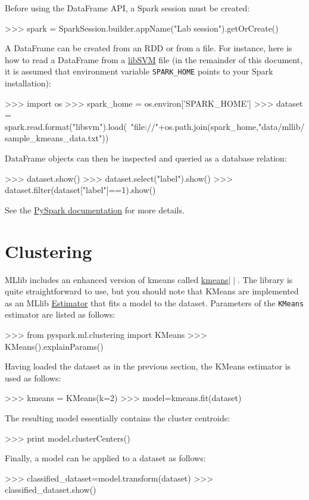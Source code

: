 \documentclass[11pt]{article}
\begin{document}
Before using the DataFrame API, a Spark session must be created:
\begin{cli}
  >>> spark = SparkSession.builder.appName("Lab session").getOrCreate()
\end{cli}
A DataFrame can be created from an RDD or from a file. For instance,
here is how to read a DataFrame from a
\href{https://www.csie.ntu.edu.tw/~cjlin/libsvm/}{libSVM} file (in the
remainder of this document, it is assumed that environment variable
\texttt{SPARK\_HOME} points to your Spark installation):
\begin{cli}
  >>> import os
  >>> spark_home = os.environ['SPARK_HOME']
  >>> dataset = spark.read.format("libsvm").load(\
      "file://"+os.path.join(spark_home,"data/mllib/sample_kmeans_data.txt"))
\end{cli}
DataFrame objects can then be inspected and queried as a database relation:
\begin{cli}
>>> dataset.show()
>>> dataset.select("label").show()
>>> dataset.filter(dataset["label"]==1).show()
\end{cli}
See the \href{http://spark.apache.org/docs/latest/api/python/pyspark.sql.html#pyspark.sql.DataFrame}{PySpark documentation} for more details.

\section{Clustering}

MLlib includes an enhanced version of kmeans called
\href{http://theory.stanford.edu/~sergei/papers/vldb12-kmpar.pdf}{kmeans$\mid\mid$}. The
library is quite straightforward to use, but you should note that
KMeans are implemented as an MLlib
\href{http://spark.apache.org/docs/latest/api/python/pyspark.ml.html?highlight=estimator#pyspark.ml.Estimator}{Estimator}
that fits a model to the dataset.
Parameters of the \texttt{KMeans} estimator are listed as follows:
\begin{cli}
  >>> from pyspark.ml.clustering import KMeans
  >>> KMeans().explainParams()
\end{cli}
Having loaded the dataset as in the previous section, the KMeans
estimator is used as follows:
\begin{cli}
  >>> kmeans = KMeans(k=2)
  >>> model=kmeans.fit(dataset)
\end{cli}
The resulting model essentially contains the cluster centroids:
\begin{cli}
  >>> print model.clusterCenters()
\end{cli}
Finally, a model can be applied to a dataset as follows:
\begin{cli}
  >>> classified_dataset=model.transform(dataset)
  >>> classified_dataset.show()
\end{cli}
\end{document}
